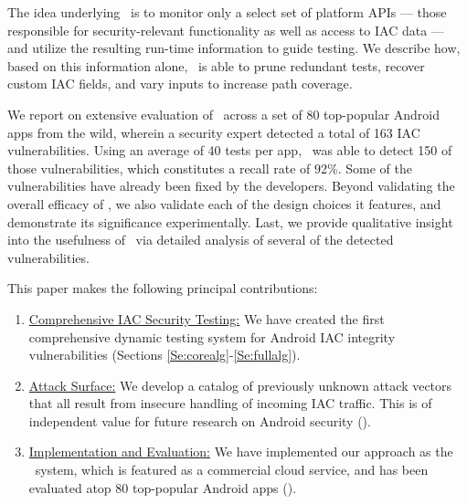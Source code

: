 The idea underlying \Tool\ is to monitor only a select set of platform APIs --- those responsible for security-relevant functionality as well as access to IAC data --- and utilize the resulting run-time information to guide testing. We describe how, based on this information alone, \Tool\ is able to prune redundant tests, recover custom IAC fields, and vary inputs to increase path coverage.  

We report on extensive evaluation of \Tool\ across a set of 80 top-popular Android apps from the wild, wherein a security expert detected a total of 163 IAC vulnerabilities. 
Using an average of 40 tests per app, \Tool\ was able to detect 150 of those vulnerabilities, which constitutes a recall rate of 92\%. Some of the vulnerabilities have already been fixed by the developers. Beyond validating the overall efficacy of \Tool, we also validate each of the design choices it features, and demonstrate its significance experimentally. Last, we provide qualitative insight into the usefulness of \Tool\ via detailed analysis of several of the detected vulnerabilities.

 This paper makes the following principal contributions:
\begin{enumerate}
	\item \underline{Comprehensive IAC Security Testing:} We have created the first comprehensive dynamic testing system for Android IAC integrity vulnerabilities (Sections \ref{Se:corealg}-\ref{Se:fullalg}).
	\item \underline{Attack Surface:} We develop a catalog of previously unknown attack vectors that all result from insecure handling of incoming IAC traffic. This is of independent value for future research on Android security (). 
	\item \underline{Implementation and Evaluation:} We have implemented our approach as the \Tool\ system, which is featured as a commercial cloud service, and has been evaluated atop 80 top-popular Android apps ().
\end{enumerate}


 